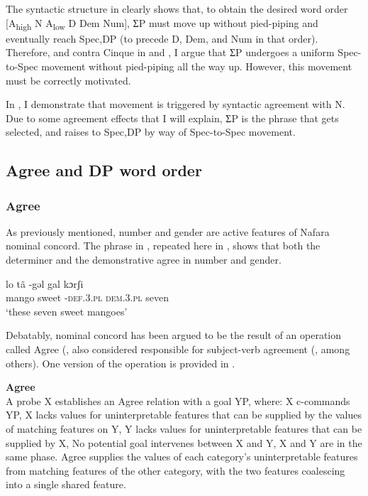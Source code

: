 \documentclass[output=paper]{langscibook}
\begin{document}
The syntactic structure in  clearly shows that, to obtain the desired word order [A\textsubscript{high} N A\textsubscript{low} D Dem Num], ƩP must move up without pied-piping and eventually reach Spec,DP (to precede D, Dem, and Num in that order). Therefore, and contra Cinque in  and , I argue that ƩP undergoes a uniform Spec-to-Spec movement without pied-piping all the way up. However, this movement must be correctly motivated. 

In , I demonstrate that movement is triggered by syntactic agreement with N. Due to some agreement effects that I will explain, ƩP is the phrase that gets selected, and raises to Spec,DP by way of Spec-to-Spec movement.
 
\subsection{Agree and DP word order}
\label{sec:baron:2.3}
\subsubsection{Agree}

As previously mentioned, number and gender are active features of Nafara nominal concord. The phrase in , repeated here in , shows that both the determiner and the demonstrative agree in number and gender. 


\ea\label{ex:baron:17}
lo tã -gəl gal kɔrʃi\\
   mango sweet -\textsc{def.3.pl} \textsc{dem.3.pl} seven\\
\glt ‘these seven sweet mangoes’
\z

Debatably, nominal concord has been argued to be the result of an operation called Agree (\citealt{Chomsky2000,Chomsky2001}, also considered responsible for subject-verb agreement (\citealt{Baker2008,Carstens2001,Collins2004}, among others). One version of the operation is provided in .


\begin{exe}\ex\label{ex:baron:18}
\textbf{Agree} \citep[26]{Norris2014}\\
A probe X establishes an Agree relation with a goal YP, where:
\xlista
\ex X c-commands YP,
\ex X lacks values for uninterpretable features that can be supplied by the values of  matching features on Y, 
\ex Y lacks values for uninterpretable features that can be supplied by X, 
\ex No potential goal intervenes between X and Y, 
\ex X and Y are in the same phase.
\endxlista
Agree supplies the values of each category’s uninterpretable features from matching features of the other category, with the two features coalescing into a single shared feature.
\end{exe}
\end{document}
